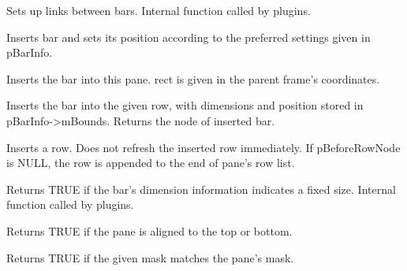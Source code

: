 \label{cbdockpaneinitlinksforrows}


Sets up links between bars.
Internal function called by plugins.


\label{cbdockpaneinsertbar}


Inserts bar and sets its position according to the preferred settings
given in pBarInfo.



Inserts the bar into this pane. rect is given in the parent frame's coordinates.



Inserts the bar into the given row, with dimensions and position
stored in pBarInfo->mBounds. Returns the node of inserted bar.


\label{cbdockpaneinsertrow}


Inserts a row. Does not refresh the inserted row immediately.
If pBeforeRowNode is NULL, the row is appended to the end of pane's row list.


\label{cbdockpaneisfixedsize}


Returns TRUE if the bar's dimension information indicates a fixed size.
Internal function called by plugins.


\label{cbdockpaneishorizontal}


Returns TRUE if the pane is aligned to the top or bottom.


\label{cbdockpanematchesmask}


Returns TRUE if the given mask matches the pane's mask.


\label{cbdockpanepaintbar}

